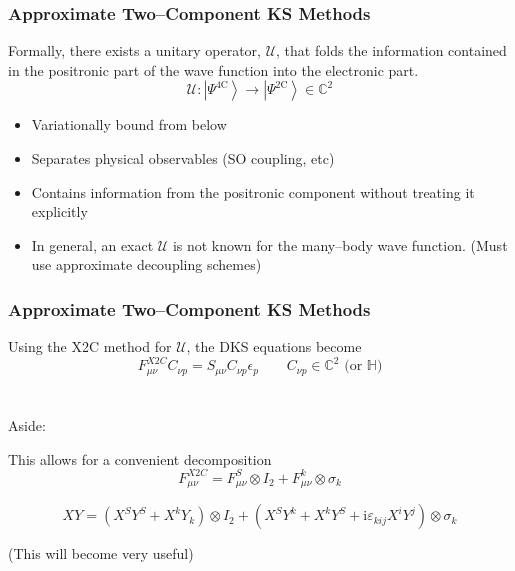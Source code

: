 \documentclass{beamer}
\newcommand{\bpar}[1]{\left( #1 \right)}                  %
\newcommand{\ket}[1]{\left \vert #1 \right \rangle}
\begin{document}
\begin{frame}
\frametitle{Approximate Two--Component KS Methods}

Formally, there exists a unitary operator, $\mathcal{U}$, that folds the information
contained in the positronic part of the wave function into the electronic part.
\begin{equation*}
\mathcal{U} : \ket{\Psi^\mathrm{4C}} \rightarrow \ket{\Psi^\mathrm{2C}} \in \mathbb{C}^2
\end{equation*}

\begin{itemize}
  \color{green}
  \item Variationally bound from below
  \item Separates physical observables (SO coupling, etc)
  \item Contains information from the positronic component without treating it explicitly
\end{itemize}

\begin{itemize}
  \color{red}
  \item In general, an exact $\mathcal{U}$ is not known for the many--body wave function.
  (Must use approximate decoupling schemes)
\end{itemize}

\end{frame}


\begin{frame}
\frametitle{Approximate Two--Component KS Methods}

Using the X2C method for $\mathcal{U}$, the DKS equations become
\begin{equation*}
F^{X2C}_{\mu\nu} C_{\nu p} = S_{\mu\nu} C_{\nu p} \epsilon_p \qquad C_{\nu p} \in \mathbb{C}^2 \text{ (or }\mathbb{H})
\end{equation*}
~\\
~\\
\color{white}
Aside: 

This allows for a convenient decomposition
\begin{equation*}
F_{\mu\nu}^{X2C} = F_{\mu\nu}^S \otimes I_2 + F_{\mu\nu}^k \otimes \sigma_k
\end{equation*}


\begin{equation*}
XY = \bpar{X^SY^S + X^kY_k} \otimes I_2 + \bpar{X^S Y^k + X^k Y^S + \mathrm{i}\varepsilon_{kij}X^iY^j}\otimes \sigma_k
\end{equation*}
\begin{center} (This will become very useful) \end{center}
\end{frame}
\end{document}
